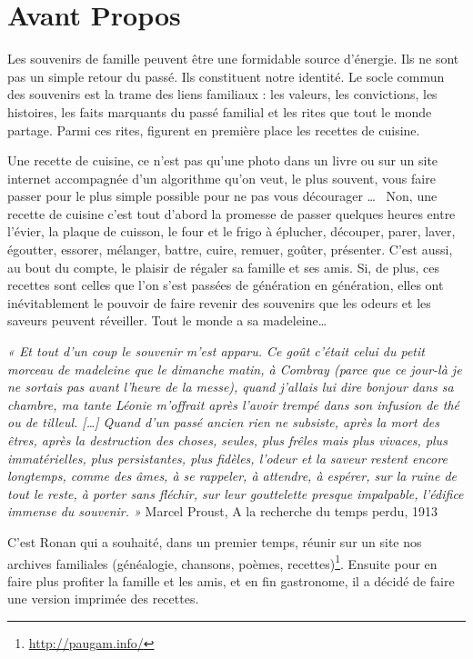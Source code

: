 \section*{Avant Propos}
Les souvenirs de famille peuvent être une formidable source d’énergie. Ils ne sont pas un simple retour du passé. Ils constituent notre identité. Le socle commun des souvenirs est la trame des liens familiaux : les valeurs, les convictions, les histoires, les faits marquants du passé familial et les rites que tout le monde partage. Parmi ces rites, figurent en première place les recettes de cuisine. 

Une recette de cuisine, ce n’est pas qu’une photo dans un livre ou sur un site internet accompagnée d’un algorithme qu’on veut, le plus souvent, vous faire passer pour le plus simple possible pour ne pas vous décourager \ldots~ Non, une recette de cuisine c’est tout d’abord la promesse de passer quelques heures entre l’évier, la plaque de cuisson, le four et le frigo à éplucher, découper, parer, laver, égoutter, essorer, mélanger, battre, cuire, remuer, goûter, présenter. C’est aussi, au bout du compte, le plaisir de régaler sa famille et ses amis. Si, de plus, ces recettes sont celles que l’on s’est passées de génération en génération, elles ont inévitablement le pouvoir de faire revenir des souvenirs que les odeurs et les saveurs peuvent réveiller. Tout le monde a sa madeleine\ldots

\textit{« Et tout d'un coup le souvenir m'est apparu. Ce goût c'était celui du petit morceau de madeleine que le dimanche matin, à Combray (parce que ce jour-là je ne sortais pas avant l'heure de la messe), quand j'allais lui dire bonjour dans sa chambre, ma tante Léonie m'offrait après l'avoir trempé dans son infusion de thé ou de tilleul. [\ldots] Quand d'un passé ancien rien ne subsiste, après la mort des êtres, après la destruction des choses, seules, plus frêles mais plus vivaces, plus immatérielles, plus persistantes, plus fidèles, l'odeur et la saveur restent encore longtemps, comme des âmes, à se rappeler, à attendre, à espérer, sur la ruine de tout le reste, à porter sans fléchir, sur leur gouttelette presque impalpable, l'édifice immense du souvenir. »} Marcel Proust, A la recherche du temps perdu, 1913

C’est Ronan qui a souhaité, dans un premier temps, réunir sur un site nos archives familiales (généalogie, chansons, poèmes, recettes)\footnote{\url{http://paugam.info/}}. Ensuite pour en faire plus profiter la famille et les amis, et en fin gastronome, il a décidé de faire une version imprimée des recettes. 
      
